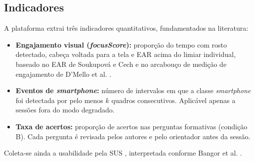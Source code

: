\documentclass[12pt,a4paper]{article}
\begin{document}
\subsection{Indicadores}
A plataforma extrai três indicadores quantitativos, fundamentados na literatura:
\begin{itemize}[leftmargin=*]
  \item \textbf{Engajamento visual (\emph{focusScore}):} proporção do tempo com rosto detectado, cabeça voltada para a tela e EAR acima do limiar individual, baseado no EAR de Soukupová e Cech \cite{SC16} e no arcabouço de medição de engajamento de D'Mello et al. \cite{DDD17}.
  \item \textbf{Eventos de \emph{smartphone}:} número de intervalos em que a classe \emph{smartphone} foi detectada por pelo menos $k$ quadros consecutivos. Aplicável apenas a sessões fora do modo degradado.
  \item \textbf{Taxa de acertos:} proporção de acertos nas perguntas formativas (condição B). Cada pergunta é revisada pelos autores e pelo orientador antes da sessão.
\end{itemize}
Coleta-se ainda a usabilidade pela SUS \cite{Bro96}, interpretada conforme Bangor et al. \cite{BKM08}.
\end{document}
